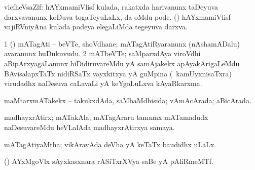 \bentry
{} 
\gl{\nA}
\bmng
vicfheVsaZlf: 
\banum
{} hAYxmamiVlisf kulada, rakatxda harivanunx taDeyuva darxvavanunx koDuva togaTeyuLaLx, \ame da oMdu pode. 
 (\kanmu) hAYxmamiVlisf vajiRVniyAna kulada podeya elegaLiMda tegeyuva darxva. 
\eanum
\emng
\eentry

\bentry
{} 
\gl{\nA}
\expl{}
\bmng
\bnum
\num{1} (\ca) mATagAti -- beVTe, shoVdhane; mATagAtiRyaranunx (nAshamADalu) avaranunx huDukuvudu. 
\num{2} mATbeVTe; saMparxdAya viroVdhi aBipArxyagaLanunx hiDidiruvareMdu yA samAjakekx apAyakArigaLeMdu BAvisalapxTaTx nidiRSaTx vayxkitxya yA guMpina (\kanmu\ kamUyxnisaTxra) virudadhx naDesuva caLavaLi yA keYgoLuLxva kAyaRkarxma. 
\enum
\emng
\eentry

\bentry
{} 
\gl{\gu}
\expl{}
\bmng
maMtarxmATakekx -- takukxdAda, saMbaMdhisida; vAmAcArada; aBicArada. 
\emng
\eentry

\bentry
{} 
\gl{\nA}
\expl{}
\bmng
madhayxrAtirx; mATakAla; mATagAraru tamamx mATamadudx naDesuvareMdu heVLalAda madhayxrAtirxya samaya. 
\emng
\eentry

\bentry
{} 
\gl{\gu}
\expl{}
\bmng
mATagAtiyaMtha; vikAravAda deVha yA keTaTx baudidhx uLaLx. 
\emng
\eentry

\bentry
{} 
\gl{\nA}
\expl{}
\bmng
(\ca) AYxMgoVlx sAyxkasxnara rASiTxrXVya saBe yA pAliRmeMTf. 
\emng
\eentry

